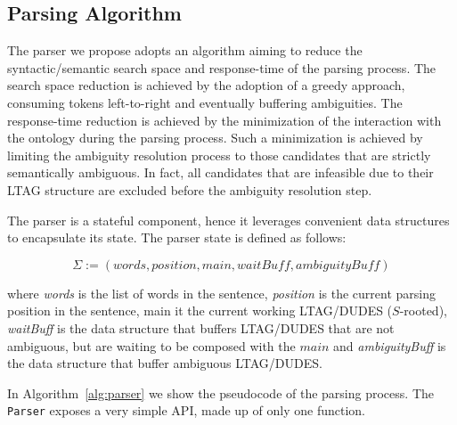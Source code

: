 \subsection{Parsing Algorithm}
\label{sec:parsing-algorithm}

The parser we propose adopts an algorithm aiming to reduce the syntactic/semantic search space and response-time of the parsing process.
%
The search space reduction is achieved by the adoption of a greedy approach, consuming tokens left-to-right and eventually buffering ambiguities.
%
The response-time reduction is achieved by the minimization of the interaction with the ontology during the parsing process. 
%
Such a minimization is achieved by limiting the ambiguity resolution process to those candidates that are strictly semantically ambiguous.
%
In fact, all candidates that are infeasible due to their LTAG structure are excluded before the ambiguity resolution step. 

The parser is a stateful component, hence it leverages convenient data structures to encapsulate its state.
%
The parser state is defined as follows:

\begin{equation}
\label{eqn:parser-state}
	\Sigma:=(words,position,main,waitBuff,ambiguityBuff)
\end{equation}

where
\textit{words} is the list of words in the sentence,
\textit{position} is the current parsing position in the sentence,
main it the current working LTAG/DUDES ($S$-rooted),
\textit{waitBuff} is the data structure that buffers LTAG/DUDES that are not ambiguous, but are waiting to be composed with the $main$ and 
\textit{ambiguityBuff} is the data structure that buffer ambiguous LTAG/DUDES.

In Algorithm~\ref{alg:parser} we show the pseudocode of the parsing process.
%
The \texttt{Parser} exposes a very simple API, made up of only one function.

